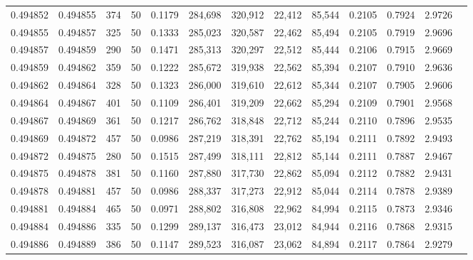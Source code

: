 \begin{tabular}{rrrrrrrrrrrrr}
0.494852 & 0.494855 &   374 &  50 &                                     0.1179 & 284,698 & 320,912 &  22,412 &  85,544 & 0.2105 & 0.7924 & 2.9726 \\
0.494855 & 0.494857 &   325 &  50 &                                     0.1333 & 285,023 & 320,587 &  22,462 &  85,494 & 0.2105 & 0.7919 & 2.9696 \\
0.494857 & 0.494859 &   290 &  50 &                                     0.1471 & 285,313 & 320,297 &  22,512 &  85,444 & 0.2106 & 0.7915 & 2.9669 \\
0.494859 & 0.494862 &   359 &  50 &                                     0.1222 & 285,672 & 319,938 &  22,562 &  85,394 & 0.2107 & 0.7910 & 2.9636 \\
0.494862 & 0.494864 &   328 &  50 &                                     0.1323 & 286,000 & 319,610 &  22,612 &  85,344 & 0.2107 & 0.7905 & 2.9606 \\
0.494864 & 0.494867 &   401 &  50 &                                     0.1109 & 286,401 & 319,209 &  22,662 &  85,294 & 0.2109 & 0.7901 & 2.9568 \\
0.494867 & 0.494869 &   361 &  50 &                                     0.1217 & 286,762 & 318,848 &  22,712 &  85,244 & 0.2110 & 0.7896 & 2.9535 \\
0.494869 & 0.494872 &   457 &  50 &                                     0.0986 & 287,219 & 318,391 &  22,762 &  85,194 & 0.2111 & 0.7892 & 2.9493 \\
0.494872 & 0.494875 &   280 &  50 &                                     0.1515 & 287,499 & 318,111 &  22,812 &  85,144 & 0.2111 & 0.7887 & 2.9467 \\
0.494875 & 0.494878 &   381 &  50 &                                     0.1160 & 287,880 & 317,730 &  22,862 &  85,094 & 0.2112 & 0.7882 & 2.9431 \\
0.494878 & 0.494881 &   457 &  50 &                                     0.0986 & 288,337 & 317,273 &  22,912 &  85,044 & 0.2114 & 0.7878 & 2.9389 \\
0.494881 & 0.494884 &   465 &  50 &                                     0.0971 & 288,802 & 316,808 &  22,962 &  84,994 & 0.2115 & 0.7873 & 2.9346 \\
0.494884 & 0.494886 &   335 &  50 &                                     0.1299 & 289,137 & 316,473 &  23,012 &  84,944 & 0.2116 & 0.7868 & 2.9315 \\
0.494886 & 0.494889 &   386 &  50 &                                     0.1147 & 289,523 & 316,087 &  23,062 &  84,894 & 0.2117 & 0.7864 & 2.9279 \\

\end{tabular}
